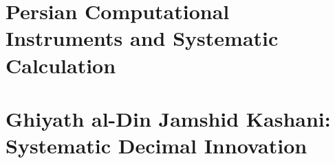 \section{Persian Computational Instruments and Systematic Calculation}

\section{Ghiyath al-Din Jamshid Kashani: Systematic Decimal Innovation}
